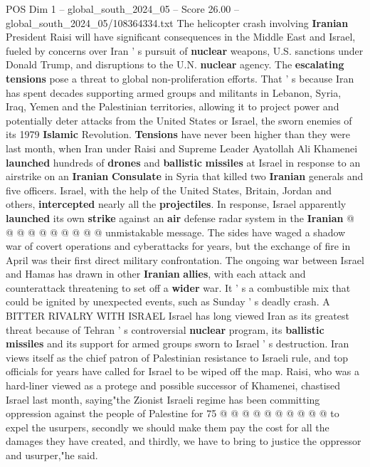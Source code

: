 \begin{textsample}{POS Dim 1 – global\_south\_2024\_05 – Score 26.00 – global\_south\_2024\_05/108364334.txt}  \label{ex:f1_pos_241}
The helicopter crash involving \textbf{Iranian} President Raisi will have significant consequences in the Middle East and Israel, fueled by concerns over Iran ' s pursuit of \textbf{nuclear} weapons, U.S. sanctions under Donald Trump, and disruptions to the U.N. \textbf{nuclear} agency.
The \textbf{escalating} \textbf{tensions} pose a threat to global non-proliferation efforts.
That ' s because Iran has spent decades supporting armed groups and militants in Lebanon, Syria, Iraq, Yemen and the Palestinian territories, allowing it to project power and potentially deter attacks from the United States or Israel, the sworn enemies of its 1979 \textbf{Islamic} Revolution. \textbf{Tensions} have never been higher than they were last month, when Iran under Raisi and Supreme Leader Ayatollah Ali Khamenei \textbf{launched} hundreds of \textbf{drones} and \textbf{ballistic} \textbf{missiles} at Israel in response to an airstrike on an \textbf{Iranian} \textbf{Consulate} in Syria that killed two \textbf{Iranian} generals and five officers.
Israel, with the help of the United States, Britain, Jordan and others, \textbf{intercepted} nearly all the \textbf{projectiles}.
In response, Israel apparently \textbf{launched} its own \textbf{strike} against an \textbf{air} defense radar system in the \textbf{Iranian} @ @ @ @ @ @ @ @ @ @ unmistakable message.
The sides have waged a shadow war of covert operations and cyberattacks for years, but the exchange of fire in April was their first direct military confrontation.
The ongoing war between Israel and Hamas has drawn in other \textbf{Iranian} \textbf{allies}, with each attack and counterattack threatening to set off a \textbf{wider} war.
It ' s a combustible mix that could be ignited by unexpected events, such as Sunday ' s deadly crash.
A BITTER RIVALRY WITH ISRAEL Israel has long viewed Iran as its greatest threat because of Tehran ' s controversial \textbf{nuclear} program, its \textbf{ballistic} \textbf{missiles} and its support for armed groups sworn to Israel ' s destruction.
Iran views itself as the chief patron of Palestinian resistance to Israeli rule, and top officials for years have called for Israel to be wiped off the map.
Raisi, who was a hard-liner viewed as a protege and possible successor of Khamenei, chastised Israel last month, saying"the Zionist Israeli regime has been committing oppression against the people of Palestine for 75 @ @ @ @ @ @ @ @ @ @ to expel the usurpers, secondly we should make them pay the cost for all the damages they have created, and thirdly, we have to bring to justice the oppressor and usurper,"he said.

\end{textsample}
